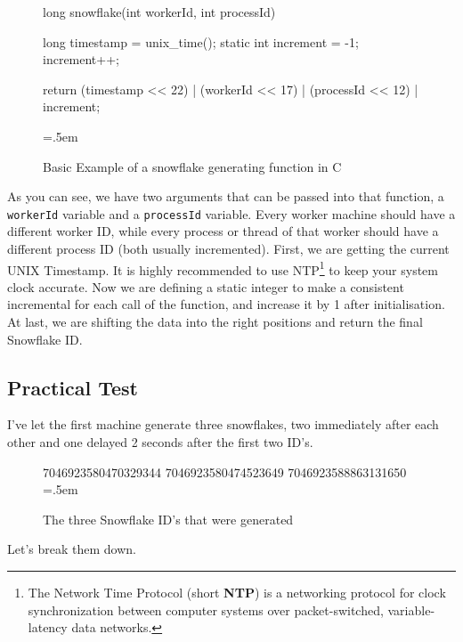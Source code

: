 \documentclass{article}
\newcommand{\code}[1]{\colorbox{cverbbg}{\texttt{#1}}}
\newcommand{\hn}[0]{\hfill \newline}
\newenvironment{lcverbatim}
 {\SaveVerbatim{cverb}}
 {\endSaveVerbatim
  \flushleft\fboxrule=0pt\fboxsep=.5em
  \colorbox{cverbbg}{%
    \makebox[\dimexpr\linewidth-2\fboxsep][l]{\BUseVerbatim{cverb}}%
  }
  \endflushleft
}
\begin{document}
\begin{figure}[H]
    \begin{lcverbatim}
    long snowflake(int workerId, int processId) {
        long timestamp = unix_time();
        static int increment = -1;
        increment++;
        
        return (timestamp << 22)
                    | (workerId << 17)
                    | (processId << 12)
                    | increment;
    }
    \end{lcverbatim}
    \caption{Basic Example of a snowflake generating function in C}
    \label{fig:ex_gen_function}
\end{figure}
\hn
As you can see, we have two arguments that can be passed into that function, a \code{workerId} variable and a \code{processId} variable. Every worker machine should have a different worker ID, while every process or thread of that worker should have a different process ID (both usually incremented).\newline
\hn
First, we are getting the current UNIX Timestamp. It is highly recommended to use NTP\footnote{The Network Time Protocol (short \textbf{NTP}) is a networking protocol for clock synchronization between computer systems over packet-switched, variable-latency data networks.} to keep your system clock accurate. \newline
\hn
Now we are defining a static integer to make a consistent incremental for each call of the function, and increase it by 1 after initialisation. \newline
\hn
At last, we are shifting the data into the right positions and return the final Snowflake ID.

\pagebreak

\subsection{Practical Test}
I've let the first machine generate three snowflakes, two immediately after each other and one delayed 2 seconds after the first two ID's.

\begin{figure}[H]
    \begin{lcverbatim}
    7046923580470329344
    7046923580474523649
    7046923588863131650
    \end{lcverbatim}
    \caption{The three Snowflake ID's that were generated}
    \label{fig:output_1}
\end{figure}
\hn
Let's break them down. \newline
\end{document}

